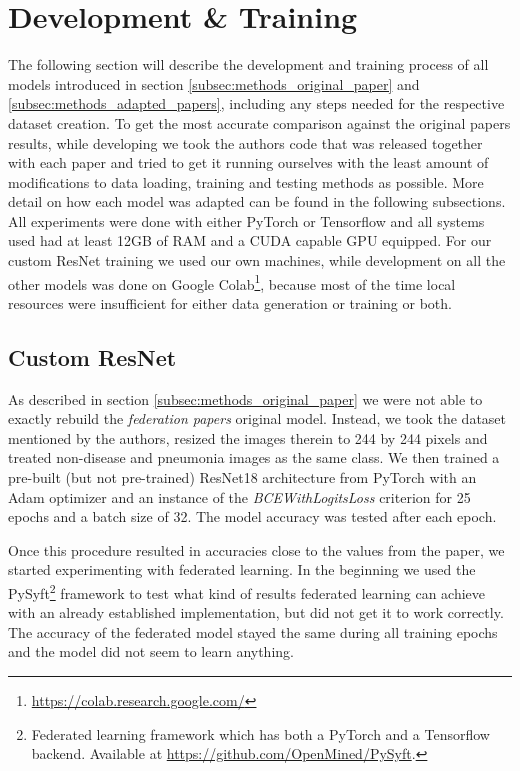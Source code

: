 \section{Development \& Training}\label{sec:dev_and_training}
The following section will describe the development and training process of all models introduced in section \ref{subsec:methods_original_paper} and \ref{subsec:methods_adapted_papers}, including any steps needed for the respective dataset creation. 
To get the most accurate comparison against the original papers results, while developing we took the authors code that was released together with each paper and tried to get it running ourselves with the least amount of modifications to data loading, training and testing methods as possible. More detail on how each model was adapted can be found in the following subsections.
All experiments were done with either PyTorch or Tensorflow and all systems used had at least 12GB of RAM and a CUDA capable GPU equipped. For our custom ResNet training we used our own machines, while development on all the other models was done on Google Colab\footnote{\url{https://colab.research.google.com/}}, because most of the time local resources were insufficient for either data generation or training or both.  


\subsection{Custom ResNet}\label{subsec:methods_resnet}
As described in section \ref{subsec:methods_original_paper} we were not able to exactly rebuild the \textit{federation papers} original model.
Instead, we took the dataset mentioned by the authors, resized the images therein to 244 by 244 pixels and treated non-disease and pneumonia images as the same class. 
We then trained a pre-built (but not pre-trained) ResNet18 architecture from PyTorch with an Adam optimizer and an instance of the \textit{BCEWithLogitsLoss} criterion for 25 epochs and a batch size of 32. The model accuracy was tested after each epoch.

Once this procedure resulted in accuracies close to the values from the paper, we started experimenting with federated learning. In the beginning we used the PySyft\footnote{Federated learning framework which has both a PyTorch and a Tensorflow backend. Available at \url{https://github.com/OpenMined/PySyft}.} framework to test what kind of results federated learning can achieve with an already established implementation, but did not get it to work correctly. The accuracy of the federated model stayed the same during all training epochs and the model did not seem to learn anything.

